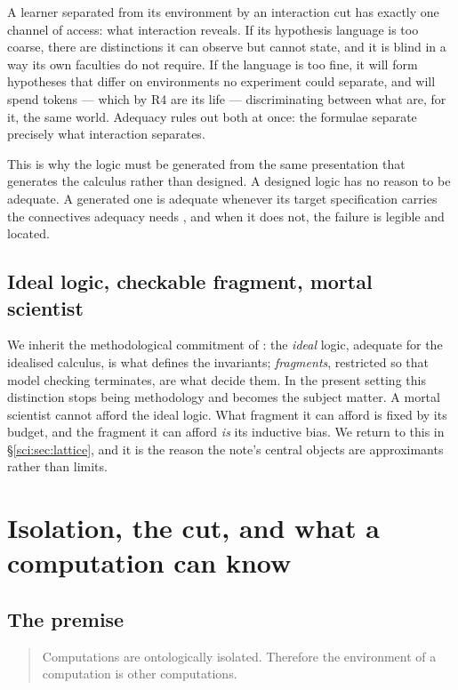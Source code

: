 A learner separated from its environment by an interaction cut has exactly one channel of access: what
interaction reveals. If its hypothesis language is too coarse, there are distinctions it can observe
but cannot state, and it is blind in a way its own faculties do not require. If the language is too
fine, it will form hypotheses that differ on environments no experiment could separate, and will spend
tokens --- which by R4 are its life --- discriminating between what are, for it, the same world.
Adequacy rules out both at once: the formulae separate precisely what interaction separates.

This is why the logic must be generated from the same presentation that generates the calculus rather
than designed. A designed logic has no reason to be adequate. A generated one is adequate whenever its
target specification carries the connectives adequacy needs \cite[\S1.3]{ClassifierNote}, and when it
does not, the failure is legible and located.

\subsection{Ideal logic, checkable fragment, mortal scientist}\label{sci:S1.6}

We inherit the methodological commitment of \cite{ClassifierNote}: the \emph{ideal} logic, adequate
for the idealised calculus, is what defines the invariants; \emph{fragments}, restricted so that model
checking terminates, are what decide them. In the present setting this distinction stops being
methodology and becomes the subject matter. A mortal scientist cannot afford the ideal logic. What
fragment it can afford is fixed by its budget, and the fragment it can afford \emph{is} its inductive
bias. We return to this in \S\ref{sci:sec:lattice}, and it is the reason the note's central objects are
approximants rather than limits.

\section{Isolation, the cut, and what a computation can know}\label{sci:S2}
\label{sci:sec:cut}

\subsection{The premise}\label{sci:S2.1}

\begin{quote}
Computations are ontologically isolated. Therefore the environment of a computation is other
computations.
\end{quote}

